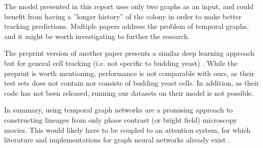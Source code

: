 \documentclass[10pt,conference,compsocconf,a4paper]{IEEEtran}
\begin{document}
	The model presented in this report uses only two graphs as an input, and could benefit from having a ''longer history'' of the colony in order to make better tracking predictions. Multiple papers \cite{singer_node_2019,jin_recurrent_2020,rossi_temporal_2020} address the problem of temporal graphs, and it might be worth investigating to further the research.
	
	
	The preprint version of another paper presents a similar deep learning approach but for general cell tracking (i.e. not specific to budding yeast)
	\cite{GNN-tracking}. While the preprint is worth mentioning, performance is not comparable with ours, as their test sets does not contain nor consists of budding yeast cells. In addition, as their code has not been released, running our datasets on their model is not possible.
	
	In summary, using temporal graph networks are a promising approach to constructing lineages from only phase contrast (or bright field) microscopy movies. This would likely have to be coupled to an attention system, for which literature and implementations for graph neural networks already exist \cite{velickovic_graph_2018,brody_how_2021}.


\newpage



\newpage
\appendix
\end{document}
